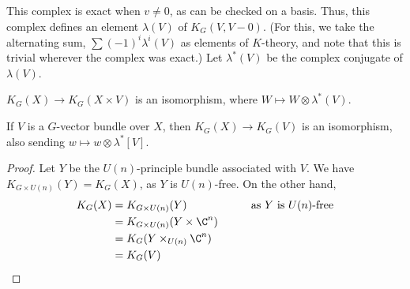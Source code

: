 \documentclass[11pt]{article}
\begin{document}
\begin{GuozhenEqKthyPractice}
This complex is exact when $v\neq 0$, as can be checked on a basis. Thus, this complex defines an element $\lambda(V)$ of $K_G(V,V-0)$. (For this, we take the alternating sum, $\sum (-1)^i \lambda^i(V)$ as elements of $K$-theory, and note that this is trivial wherever the complex was exact.)
Let $\lambda^*(V)$ be the complex conjugate of $\lambda(V)$.
\begin{thm*}
$K_G(X)\to K_G(X\times V)$ is an isomorphism, where $W\mapsto W\otimes\lambda^*(V)$.
\end{thm*}
\noindent{}
\begin{cor*}
If $V$ is a $G$-vector bundle over $X$, then $K_G(X)\to K_G(V)$ is an isomorphism, also sending $w\mapsto w\otimes \lambda^*[V]$.
\end{cor*}
\begin{proof}
Let $Y$ be the $U(n)$-principle bundle associated with $V$. We have $K_{G\times U(n)}(Y)=K_G(X)$, as $Y$ is $U(n)$-free. On the other hand, 
\begin{alignat*}{2}
K_G(X)&=K_{G\times U(n)}(Y)&&\text{as $Y$ is $U(n)$-free}\\
&=K_{G\times U(n)}(Y\times\C^n)&\qquad&\\
&=K_G(Y\times_{U(n)} \C^n)&&\text{}\\
&=K_G(V)&&\text{}
\end{alignat*}
\end{proof}

\end{GuozhenEqKthyPractice}
\end{document}
